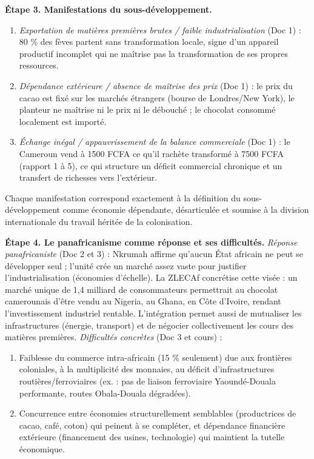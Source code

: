 \documentclass[11pt]{article}
\newcommand{\cle}[1]{{\popxbold\color{popdark}#1}}
\begin{document}
\begin{exoresolu}
\textbf{Étape 3. Manifestations du sous-développement.}
\begin{enumerate}
\item \emph{Exportation de matières premières brutes / faible industrialisation} (Doc 1) : 80 \% des fèves partent sans transformation locale, signe d'un appareil productif incomplet qui ne maîtrise pas la transformation de ses propres ressources.
\item \emph{Dépendance extérieure / absence de maîtrise des prix} (Doc 1) : le prix du cacao est fixé sur les marchés étrangers (bourse de Londres/New York), le planteur ne maîtrise ni le prix ni le débouché ; le chocolat consommé localement est importé.
\item \emph{Échange inégal / appauvrissement de la balance commerciale} (Doc 1) : le Cameroun vend à \num{1500} FCFA ce qu'il rachète transformé à \num{7500} FCFA (rapport 1 à 5), ce qui structure un déficit commercial chronique et un transfert de richesses vers l'extérieur.
\end{enumerate}
Chaque manifestation correspond exactement à la définition du sous-développement comme économie dépendante, désarticulée et soumise à la division internationale du travail héritée de la colonisation.

\textbf{Étape 4. Le panafricanisme comme réponse et ses difficultés.}
\emph{Réponse panafricaniste} (Doc 2 et 3) : Nkrumah affirme qu'aucun État africain ne peut se développer seul ; l'\cle{unité} crée un marché assez vaste pour justifier l'industrialisation (économies d'échelle). La ZLECAf concrétise cette visée : un marché unique de 1,4 milliard de consommateurs permettrait au chocolat camerounais d'être vendu au Nigeria, au Ghana, en Côte d'Ivoire, rendant l'investissement industriel rentable. L'intégration permet aussi de mutualiser les infrastructures (énergie, transport) et de négocier collectivement les cours des matières premières.
\emph{Difficultés concrètes} (Doc 3 et cours) :
\begin{enumerate}
\item Faiblesse du commerce intra-africain (15 \% seulement) due aux frontières coloniales, à la multiplicité des monnaies, au déficit d'infrastructures routières/ferroviaires (ex. : pas de liaison ferroviaire Yaoundé-Douala performante, routes Obala-Douala dégradées).
\item Concurrence entre économies structurellement semblables (productrices de cacao, café, coton) qui peinent à se compléter, et dépendance financière extérieure (financement des usines, technologie) qui maintient la tutelle économique.
\end{enumerate}


\end{exoresolu}
\end{document}
